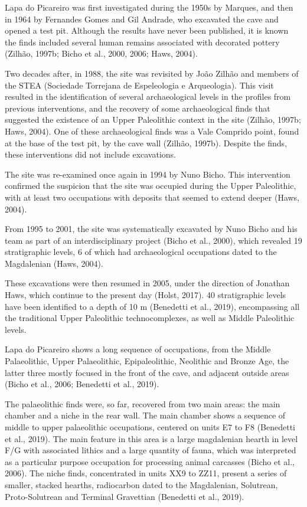 \documentclass[12pt,twoside]{reedthesis}
\begin{document}
Lapa do Picareiro was first investigated during the 1950s by Marques, and then in 1964 by Fernandes Gomes and Gil Andrade, who excavated the cave and opened a test pit. Although the results have never been published, it is known the finds included several human remains associated with decorated pottery (Zilhão, 1997b; Bicho et al., 2000, 2006; Haws, 2004).

Two decades after, in 1988, the site was revisited by João Zilhão and members of the STEA (Sociedade Torrejana de Espeleologia e Arqueologia). This visit resulted in the identification of several archaeological levels in the profiles from previous interventions, and the recovery of some archaeological finds that suggested the existence of an Upper Paleolithic context in the site (Zilhão, 1997b; Haws, 2004). One of these archaeological finds was a Vale Comprido point, found at the base of the test pit, by the cave wall (Zilhão, 1997b). Despite the finds, these interventions did not include excavations.

The site was re-examined once again in 1994 by Nuno Bicho. This intervention confirmed the suspicion that the site was occupied during the Upper Paleolithic, with at least two occupations with deposits that seemed to extend deeper (Haws, 2004).

From 1995 to 2001, the site was systematically excavated by Nuno Bicho and his team as part of an interdisciplinary project (Bicho et al., 2000), which revealed 19 stratigraphic levels, 6 of which had archaeological occupations dated to the Magdalenian (Haws, 2004).

These excavations were then resumed in 2005, under the direction of Jonathan Haws, which continue to the present day (Holst, 2017). 40 stratigraphic levels have been identified to a depth of 10 m (Benedetti et al., 2019), encompassing all the traditional Upper Paleolithic technocomplexes, as well as Middle Paleolithic levels.

Lapa do Picareiro shows a long sequence of occupations, from the Middle Palaeolithic, Upper Palaeolithic, Epipaleolithic, Neolithic and Bronze Age, the latter three mostly focused in the front of the cave, and adjacent outside areas (Bicho et al., 2006; Benedetti et al., 2019).

The palaeolithic finds were, so far, recovered from two main areas: the main chamber and a niche in the rear wall. The main chamber shows a sequence of middle to upper palaeolithic occupations, centered on units E7 to F8 (Benedetti et al., 2019). The main feature in this area is a large magdalenian hearth in level F/G with associated lithics and a large quantity of fauna, which was interpreted as a particular purpose occupation for processing animal carcasses (Bicho et al., 2006). The niche finds, concentrated in units XX9 to ZZ11, present a series of smaller, stacked hearths, radiocarbon dated to the Magdalenian, Solutrean, Proto-Solutrean and Terminal Gravettian (Benedetti et al., 2019).
\end{document}
